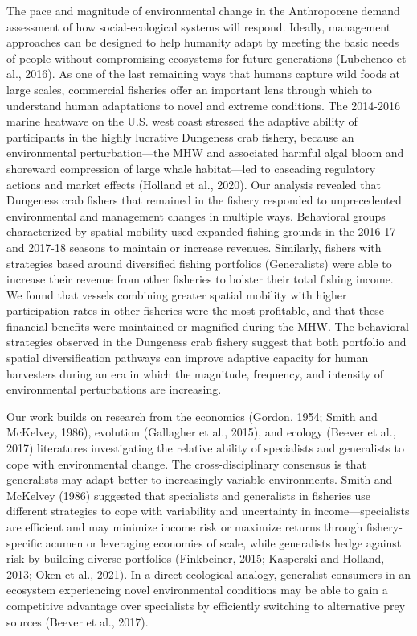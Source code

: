 \documentclass[]{elsarticle} %
\begin{document}
The pace and magnitude of environmental change in the Anthropocene
demand assessment of how social-ecological systems will respond.
Ideally, management approaches can be designed to help humanity adapt by
meeting the basic needs of people without compromising ecosystems for
future generations (Lubchenco et al., 2016). As one of the last
remaining ways that humans capture wild foods at large scales,
commercial fisheries offer an important lens through which to understand
human adaptations to novel and extreme conditions. The 2014-2016 marine
heatwave on the U.S. west coast stressed the adaptive ability of
participants in the highly lucrative Dungeness crab fishery, because an
environmental perturbation---the MHW and associated harmful algal bloom
and shoreward compression of large whale habitat---led to cascading
regulatory actions and market effects (Holland et al., 2020). Our
analysis revealed that Dungeness crab fishers that remained in the
fishery responded to unprecedented environmental and management changes
in multiple ways. Behavioral groups characterized by spatial mobility
used expanded fishing grounds in the 2016-17 and 2017-18 seasons to
maintain or increase revenues. Similarly, fishers with strategies based
around diversified fishing portfolios (Generalists) were able to
increase their revenue from other fisheries to bolster their total
fishing income. We found that vessels combining greater spatial mobility
with higher participation rates in other fisheries were the most
profitable, and that these financial benefits were maintained or
magnified during the MHW. The behavioral strategies observed in the
Dungeness crab fishery suggest that both portfolio and spatial
diversification pathways can improve adaptive capacity for human
harvesters during an era in which the magnitude, frequency, and
intensity of environmental perturbations are increasing.

Our work builds on research from the economics (Gordon, 1954; Smith and
McKelvey, 1986), evolution (Gallagher et al., 2015), and ecology (Beever
et al., 2017) literatures investigating the relative ability of
specialists and generalists to cope with environmental change. The
cross-disciplinary consensus is that generalists may adapt better to
increasingly variable environments. Smith and McKelvey (1986) suggested
that specialists and generalists in fisheries use different strategies
to cope with variability and uncertainty in income---specialists are
efficient and may minimize income risk or maximize returns through
fishery-specific acumen or leveraging economies of scale, while
generalists hedge against risk by building diverse portfolios
(Finkbeiner, 2015; Kasperski and Holland, 2013; Oken et al., 2021). In a
direct ecological analogy, generalist consumers in an ecosystem
experiencing novel environmental conditions may be able to gain a
competitive advantage over specialists by efficiently switching to
alternative prey sources (Beever et al., 2017).
\end{document}
